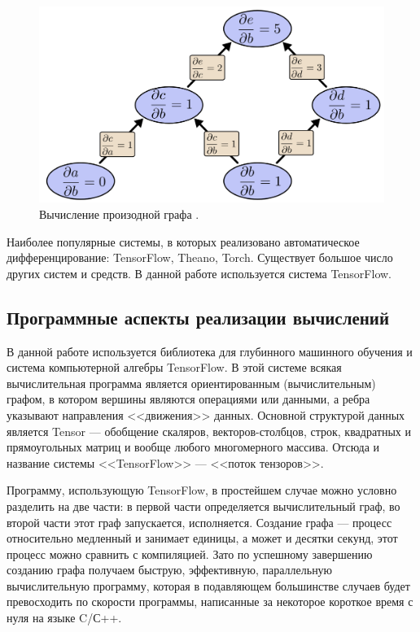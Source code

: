 \documentclass[a4paper,14pt]{extarticle}
\begin{document}
\begin{figure}[H]
\includegraphics[width=\textwidth]{tree-forwardmode}
\caption{Вычисление произодной графа \cite{colah}.}
\end{figure}


Наиболее популярные системы, в которых реализовано автоматическое
дифференцирование: TensorFlow, Theano, Torch. Существует большое число других
систем и средств. В данной работе используется система TensorFlow.

\subsection{Программные аспекты реализации вычислений}

В данной работе используется библиотека для глубинного машинного обучения и
система компьютерной алгебры TensorFlow. В этой системе всякая вычислительная
программа является ориентированным (вычислительным) графом, в котором вершины
являются операциями или данными, а ребра указывают направления <<движения>>
данных. Основной структурой данных является Tensor --- обобщение скаляров,
векторов-столбцов, строк, квадратных и прямоугольных матриц и вообще любого
многомерного массива. Отсюда и название системы <<TensorFlow>> --- <<поток
тензоров>>.

Программу, использующую TensorFlow, в простейшем случае можно условно разделить
на две части: в первой части определяется вычислительный граф, во второй части
этот граф запускается, исполняется. Создание графа --- процесс относительно
медленный и занимает единицы, а может и десятки секунд, этот процесс можно
сравнить с компиляцией. Зато по успешному завершению созданию графа получаем
быструю, эффективную, параллельную вычислительную программу, которая в
подавляющем большинстве случаев будет превосходить по скорости программы,
написанные за некоторое короткое время с нуля на языке C/С++.
\end{document}
